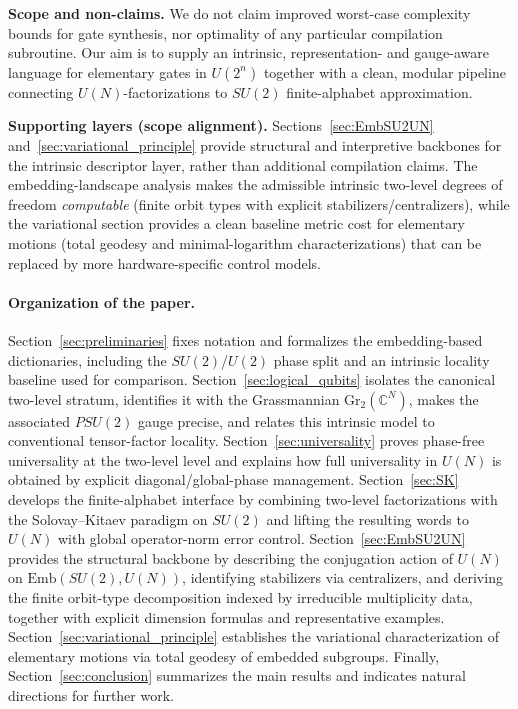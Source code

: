 \documentclass{article}%
\theoremstyle{definition}
\numberwithin{equation}{section}
\newcommand{\C}{\mathbb{C}}
\newcommand{\Gr}{\mathrm{Gr}}
\newcommand{\Emb}{\mathrm{Emb}}
\begin{document}
\noindent\textbf{Scope and non-claims.}
We do not claim improved worst-case complexity bounds for gate synthesis, nor optimality of any particular compilation subroutine.
Our aim is to supply an intrinsic, representation- and gauge-aware language for elementary gates in $U(2^n)$ together with a clean, modular
pipeline connecting $U(N)$-factorizations to $SU(2)$ finite-alphabet approximation.

\medskip
\noindent\textbf{Supporting layers (scope alignment).}
Sections~\ref{sec:EmbSU2UN} and~\ref{sec:variational_principle} provide structural and interpretive backbones for the intrinsic descriptor
layer, rather than additional compilation claims. The embedding-landscape analysis makes the admissible intrinsic two-level degrees of
freedom \emph{computable} (finite orbit types with explicit stabilizers/centralizers), while the variational section provides a clean
baseline metric cost for elementary motions (total geodesy and minimal-logarithm characterizations) that can be replaced by more
hardware-specific control models.


\paragraph{Organization of the paper.}
Section~\ref{sec:preliminaries} fixes notation and formalizes the embedding-based dictionaries,
including the $SU(2)$/$U(2)$ phase split and an intrinsic locality baseline used for comparison.
Section~\ref{sec:logical_qubits} isolates the canonical two-level stratum, identifies it with the
Grassmannian $\Gr_2(\C^N)$, makes the associated $PSU(2)$ gauge precise, and relates this intrinsic
model to conventional tensor-factor locality. Section~\ref{sec:universality} proves phase-free
universality at the two-level level and explains how full universality in $U(N)$ is obtained by
explicit diagonal/global-phase management. Section~\ref{sec:SK} develops the finite-alphabet
interface by combining two-level factorizations with the Solovay--Kitaev paradigm on $SU(2)$ and
lifting the resulting words to $U(N)$ with global operator-norm error control.
Section~\ref{sec:EmbSU2UN} provides the structural backbone by describing the conjugation action of
$U(N)$ on $\Emb(SU(2),U(N))$, identifying stabilizers via centralizers, and deriving the finite
orbit-type decomposition indexed by irreducible multiplicity data, together with explicit dimension
formulas and representative examples. Section~\ref{sec:variational_principle} establishes the
variational characterization of elementary motions via total geodesy of embedded subgroups.
Finally, Section~\ref{sec:conclusion} summarizes the main results and indicates natural directions
for further work.
\end{document}
